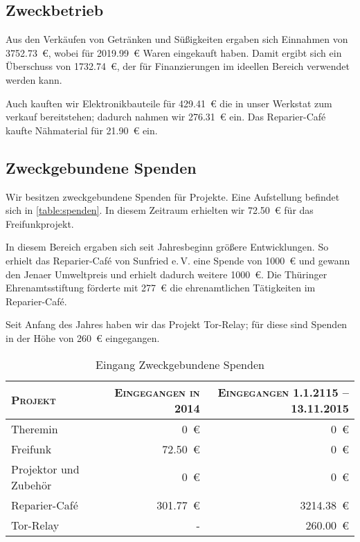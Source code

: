 \documentclass[ngerman]{scrartcl}
\begin{document}
\subsection{Zweckbetrieb}
\label{sec:Zweckbetrieb}
Aus den Verkäufen von Getränken und Süßigkeiten ergaben sich Einnahmen von \num{3752,73}~\euro{}, wobei für \num{2019,99}~\euro{} Waren eingekauft haben.
Damit ergibt sich ein Überschuss von \num{1732,74}~\euro{}, der für Finanzierungen im ideellen Bereich verwendet werden kann.

Auch kauften wir Elektronikbauteile für \num{429,41}~\euro{} die in unser Werkstat zum verkauf bereitstehen; dadurch nahmen wir \num{276,31}~\euro{} ein.
Das Reparier-Café kaufte Nähmaterial für \num{21,90}~\euro{} ein.

\subsection{Zweckgebundene Spenden}
\label{sec:zweckgebundene_spenden}
Wir besitzen zweckgebundene Spenden für Projekte. Eine Aufstellung befindet sich in \autoref{table:spenden}.
In diesem Zeitraum erhielten wir \num{72,50}~\euro{} für das Freifunkprojekt.

In diesem Bereich ergaben sich seit Jahresbeginn größere Entwicklungen.
So erhielt das Reparier-Café von Sunfried e.\,V. eine Spende von \num{1000}~\euro{} und gewann den Jenaer Umweltpreis und erhielt dadurch weitere \num{1000}~\euro{}.
Die Thüringer Ehrenamtsstiftung förderte mit \num{277}~\euro{} die ehrenamtlichen Tätigkeiten im Reparier-Café.

Seit Anfang des Jahres haben wir das Projekt Tor-Relay; für diese sind Spenden in der Höhe von \num{260}~\euro{} eingegangen.

\begin{table}[h]
	\centering
	\begin{tabular}{l|r|r}
	\toprule
	\textsc{Projekt} & \textsc{Eingegangen in 2014} & \textsc{Eingegangen 1.1.2115 – 13.11.2015} \\
	\midrule
	Theremin & \num{0}~\euro{} & \num{0}~\euro{} \\
	Freifunk & \num{72,50}~\euro{} & \num{0}~\euro{} \\
	Projektor und Zubehör & \num{0}~\euro{} & \num{0}~\euro{} \\
	Reparier-Café & \num{301,77}~\euro{} & \num{3214,38}~\euro{} \\
	Tor-Relay & - & \num{260,00}~\euro{} \\
\bottomrule
	\end{tabular}
	\caption{Eingang Zweckgebundene Spenden}
	\label{table:spenden:ein}
\end{table}
\end{document}
